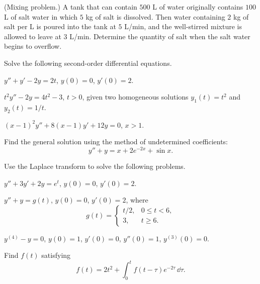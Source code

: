 \documentclass[11pt,oneside]{article}
\begin{document}
\begin{problem}
(Mixing problem.) A tank that can contain $500$ L of water originally contains $100$ L of salt water in which $5$ kg of salt is dissolved. Then water containing $2$ kg of salt per L is poured into the tank at $5$ L/min, and the well-stirred mixture is allowed to leave at $3$ L/min. Determine the quantity of salt when the salt water begins to overflow.
\end{problem}

\begin{problem}
Solve the following second-order differential equations.
\begin{problemsubparts}
\item $y''+y'-2y=2t$, $y(0)=0$, $y'(0)=2$.
\item $t^2y''-2y=4t^2-3$, $t>0$, given two homogeneous solutions $y_1(t)=t^2$ and $y_2(t)=1/t$.
\item $(x-1)^2y''+8(x-1)y'+12y=0$, $x>1$.
\end{problemsubparts}
\end{problem}

\begin{problem}
Find the general solution using the method of undetermined coefficients:
\[y''+y=x+2e^{-2x}+\sin x.\]
\end{problem}

\begin{problem}
Use the Laplace transform to solve the following problems.
\begin{problemsubparts}
\item $y''+3y'+2y=e^t$, $y(0)=0$, $y'(0)=2$.
\item $y''+y=g(t)$, $y(0)=0$, $y'(0)=2$, where
\[g(t)=\begin{cases}t/2,&0\le t<6,\\3,&t\ge6.\end{cases}\]
\item $y^{(4)}-y=0$, $y(0)=1$, $y'(0)=0$, $y''(0)=1$, $y^{(3)}(0)=0$.
\item Find $f(t)$ satisfying
\[f(t)=2t^2+\int_0^t f(t-\tau)e^{-2\tau}\,\dd\tau.\]
\end{problemsubparts}
\end{problem}
\end{document}
